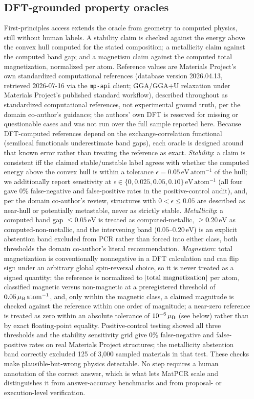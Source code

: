 \documentclass[pdflatex,sn-nature]{sn-jnl}
\begin{document}
\subsection*{DFT-grounded property oracles}
First-principles access extends the oracle from geometry to computed physics, still
without human labels. A stability claim is checked against the energy above the
convex hull computed for the stated composition; a metallicity claim against the
computed band gap; and a magnetism claim against the computed total magnetization,
normalized per atom. Reference values are Materials Project's own standardized
computational references (database version 2026.04.13, retrieved 2026-07-16 via the
\texttt{mp-api} client; GGA/GGA+U relaxation under Materials Project's published standard
workflow), described throughout as standardized computational references, not
experimental ground truth, per the domain co-author's guidance; the authors' own DFT is
reserved for missing or questionable cases and was not run over the full sample reported
here. Because DFT-computed
references depend on the exchange-correlation functional (semilocal functionals
underestimate band gaps), each oracle is designed around that known error rather than
treating the reference as exact. \emph{Stability}: a claim is consistent iff the claimed
stable/unstable label agrees with whether the computed energy above the convex hull is
within a tolerance $\epsilon=0.05\,\mathrm{eV\,atom^{-1}}$ of the hull; we additionally
report sensitivity at $\epsilon\in\{0,0.025,0.05,0.10\}\,\mathrm{eV\,atom^{-1}}$ (all four
gave 0\% false-negative and false-positive rates in the positive-control audit), and, per
the domain co-author's review, structures with $0<\epsilon\le0.05$ are described as
near-hull or potentially metastable, never as strictly stable. \emph{Metallicity}: a
computed band gap $\le0.05\,\mathrm{eV}$ is treated as computed-metallic,
$\ge0.20\,\mathrm{eV}$ as computed-non-metallic, and the intervening band
($0.05$--$0.20\,\mathrm{eV}$) is an explicit abstention band excluded from PCR rather than
forced into either class, both thresholds the domain co-author's literal recommendation.
\emph{Magnetism}: total magnetization is conventionally nonnegative in a DFT calculation
and can flip sign under an arbitrary global spin-reversal choice, so it is never treated as
a signed quantity; the reference is normalized to $|{\rm total\ magnetization}|$ per atom,
classified magnetic versus non-magnetic at a preregistered threshold of
$0.05\,\mu_{\rm B}\,{\rm atom}^{-1}$, and, only within the magnetic class, a claimed
magnitude is checked against the reference within one order of magnitude; a near-zero
reference is treated as zero within an absolute tolerance of $10^{-6}\,\mu_{\rm B}$ (see
below) rather than by exact floating-point equality. Positive-control testing showed all
three thresholds and the stability sensitivity grid give 0\% false-negative and
false-positive rates on real Materials Project structures; the metallicity abstention band
correctly excluded 125 of 3{,}000 sampled materials in that test. These checks make plausible-but-wrong physics detectable.
No step requires a human annotation of the correct answer, which is what lets MatPCR
scale and distinguishes it from answer-accuracy benchmarks and from proposal- or
execution-level verification.
\end{document}
